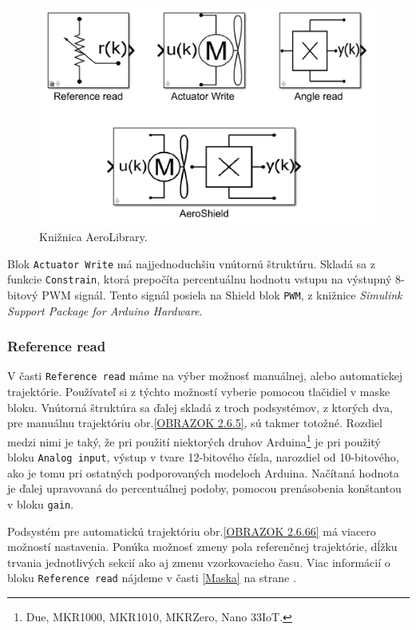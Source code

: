 \begin{figure}[!tbh]
	\centering
	\includegraphics[width=125mm]{obr/AeroLib.png}
	\caption{Knižnica AeroLibrary.}\label{OBRAZOK 2.6.4}
\end{figure}

Blok \verb|Actuator Write| má najjednoduchšiu vnútornú štruktúru. Skladá sa z funkcie \verb*|Constrain|, ktorá prepočíta percentuálnu hodnotu vstupu na výstupný 8-bitový PWM signál. Tento signál posiela na Shield blok \verb*|PWM|, z knižnice \textit{Simulink Support Package for Arduino Hardware}. 

\subsubsection{Reference read}
\label{AngleRead}

V časti \verb|Reference read| máme na výber možnosť manuálnej, alebo automatickej trajektórie. Používateľ si z týchto možností vyberie pomocou tlačidiel v maske bloku. Vnútorná štruktúra sa ďalej skladá z troch podsystémov, z ktorých dva, pre manuálnu trajektóriu obr.\ref{OBRAZOK 2.6.5}, sú takmer totožné. Rozdiel medzi nimi je taký, že pri použití niektorých druhov Arduina\footnote[8]{Due, MKR1000, MKR1010, MKRZero, Nano 33IoT.} je pri použitý bloku \verb|Analog input|, výstup v tvare 12-bitového čísla, narozdiel od 10-bitového, ako je tomu pri ostatných podporovaných modeloch Arduina. Načítaná hodnota je ďalej upravovaná do percentuálnej podoby, pomocou prenásobenia konštantou v bloku \verb*|gain|. 

Podsystém pre automatickú trajektóriu obr.\ref{OBRAZOK 2.6.66} má viacero možností nastavenia. Ponúka možnosť zmeny pola referenčnej trajektórie, dĺžku trvania jednotlivých sekcií ako aj zmenu vzorkovacieho času. Viac informácií o bloku \verb|Reference read| nájdeme v časti \ref{Maska} na strane \pageref{Maska}. 

